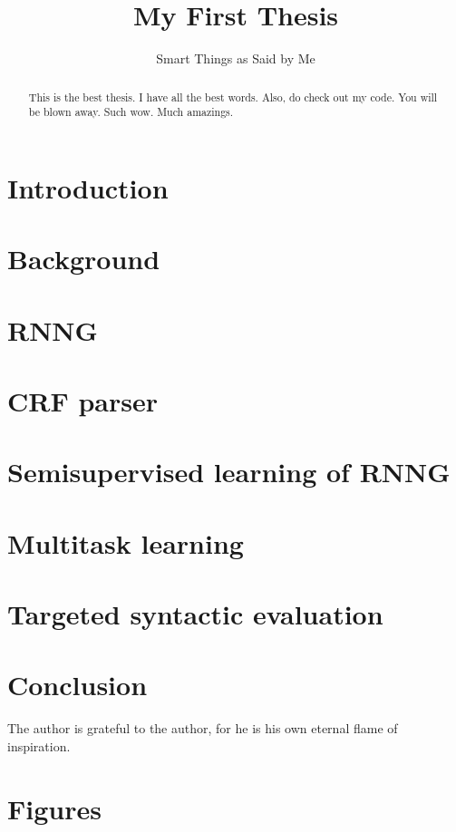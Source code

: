 \documentclass[examplefnt,biber]{../src/nowfnt} %
\title{My First Thesis}
\subtitle{Smart Things as Said by Me}
\begin{document}
\makeabstracttitle

\begin{abstract}
This is the best thesis. I have all the best words. Also, do check out my code. You will be blown away. Such wow. Much amazings.

\end{abstract}


\chapter{Introduction}
\label{01-introduction}



\chapter{Background}
\label{02-background}



\chapter{RNNG}
\label{03-rnng}



\chapter{CRF parser}
\label{04-crf}



\chapter{Semisupervised learning of RNNG}
\label{05-semisupervised}



\chapter{Multitask learning}
\label{06-multitask}



\chapter{Targeted syntactic evaluation}
\label{07-syneval}



\chapter{Conclusion}
\label{08-conclusion}



\begin{acknowledgements}
The author is grateful to the author, for he is his own eternal flame of inspiration.
\end{acknowledgements}

\appendix
\chapter{Figures}
\label{A1-figures}


\backmatter  %

\printbibliography
\end{document}

